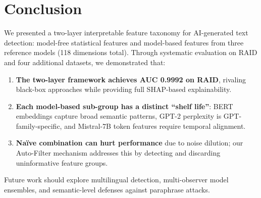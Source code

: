 \documentclass[sigconf,nonacm]{acmart}
\begin{document}
\section{Conclusion}

We presented a two-layer interpretable feature taxonomy for AI-generated text detection: model-free statistical features and model-based features from three reference models (118 dimensions total). Through systematic evaluation on RAID and four additional datasets, we demonstrated that:

\begin{enumerate}
    \item \textbf{The two-layer framework achieves AUC 0.9992 on RAID}, rivaling black-box approaches while providing full SHAP-based explainability.
    \item \textbf{Each model-based sub-group has a distinct ``shelf life''}: BERT embeddings capture broad semantic patterns, GPT-2 perplexity is GPT-family-specific, and Mistral-7B token features require temporal alignment.
    \item \textbf{Na\"{i}ve combination can hurt performance} due to noise dilution; our Auto-Filter mechanism addresses this by detecting and discarding uninformative feature groups.
\end{enumerate}

Future work should explore multilingual detection, multi-observer model ensembles, and semantic-level defenses against paraphrase attacks.
\end{document}
